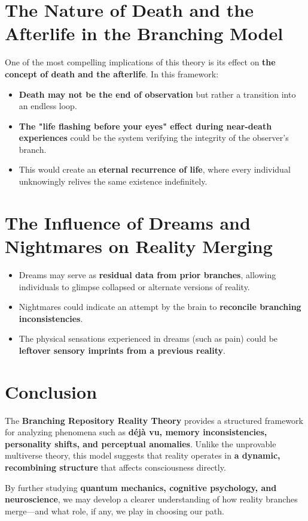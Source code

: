 \documentclass{article}
\begin{document}
\section{The Nature of Death and the Afterlife in the Branching Model}
One of the most compelling implications of this theory is its effect on \textbf{the concept of death and the afterlife}. In this framework:
\begin{itemize}
    \item \textbf{Death may not be the end of observation} but rather a transition into an endless loop.
    \item \textbf{The "life flashing before your eyes" effect during near-death experiences} could be the system verifying the integrity of the observer’s branch.
    \item This would create an \textbf{eternal recurrence of life}, where every individual unknowingly relives the same existence indefinitely.
\end{itemize}

\section{The Influence of Dreams and Nightmares on Reality Merging}
\begin{itemize}
    \item Dreams may serve as \textbf{residual data from prior branches}, allowing individuals to glimpse collapsed or alternate versions of reality.
    \item Nightmares could indicate an attempt by the brain to \textbf{reconcile branching inconsistencies}.
    \item The physical sensations experienced in dreams (such as pain) could be \textbf{leftover sensory imprints from a previous reality}.
\end{itemize}

\section{Conclusion}
The \textbf{Branching Repository Reality Theory} provides a structured framework for analyzing phenomena such as \textbf{d\'ej\`a vu, memory inconsistencies, personality shifts, and perceptual anomalies}. Unlike the unprovable multiverse theory, this model suggests that reality operates in \textbf{a dynamic, recombining structure} that affects consciousness directly.

By further studying \textbf{quantum mechanics, cognitive psychology, and neuroscience}, we may develop a clearer understanding of how reality branches merge—and what role, if any, we play in choosing our path.
\end{document}
